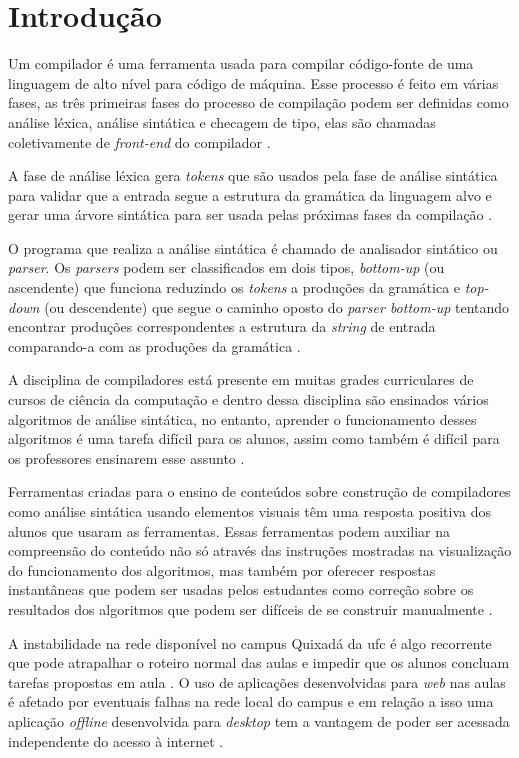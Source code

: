 \chapter{Introdução}
\label{cap:introducao}

Um compilador é uma ferramenta usada para compilar código-fonte de uma linguagem de alto nível para código de máquina. Esse processo é feito em várias fases, as três primeiras fases do processo de compilação podem ser definidas como análise léxica, análise sintática e checagem de tipo, elas são chamadas coletivamente de \textit{front-end} do compilador \cite{mogensen2024introduction}.

A fase de análise léxica gera \textit{tokens} que são usados pela fase de análise sintática para validar que a entrada segue a estrutura da gramática da linguagem alvo e gerar uma árvore sintática para ser usada pelas próximas fases da compilação \cite{thain2020introduction}.

O programa que realiza a análise sintática é chamado de analisador sintático ou \textit{parser}. Os \textit{parsers} podem ser classificados em dois tipos, \textit{bottom-up} (ou ascendente) que funciona reduzindo os \textit{tokens} a produções da gramática e \textit{top-down} (ou descendente) que segue o caminho oposto do \textit{parser bottom-up} tentando encontrar produções correspondentes a estrutura da \textit{string} de entrada comparando-a com as produções da gramática \cite{cooper2022engineering}.

A disciplina de compiladores está presente em muitas grades curriculares de cursos de ciência da computação e dentro dessa disciplina são ensinados vários algoritmos de análise sintática, no entanto, aprender o funcionamento desses algoritmos é uma tarefa difícil para os alunos, assim como também é difícil para os professores ensinarem esse assunto \cite{sangal2018pavt}.

Ferramentas criadas para o ensino de conteúdos sobre construção de compiladores como análise sintática usando elementos visuais têm uma resposta positiva dos alunos que usaram as ferramentas. Essas ferramentas podem auxiliar na compreensão do conteúdo não só através das instruções mostradas na visualização do funcionamento dos algoritmos, mas também por oferecer respostas instantâneas que podem ser usadas pelos estudantes como correção sobre os resultados dos algoritmos que podem ser difíceis de se construir manualmente \cite{10.1145/3002136}.

A instabilidade na rede disponível no campus Quixadá da \gls{ufc} é algo recorrente que pode atrapalhar o roteiro normal das aulas e impedir que os alunos concluam tarefas propostas em aula \cite{perez2023impact}. O uso de aplicações desenvolvidas para \textit{web} nas aulas é afetado por eventuais falhas na rede local do campus e em relação a isso uma aplicação \textit{offline} desenvolvida para \textit{desktop} tem a vantagem de poder ser acessada independente do acesso à internet \cite{holzer2012mobile}.

